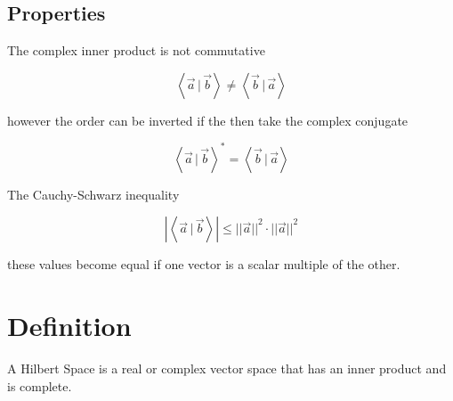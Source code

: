 \documentclass{article}
\newcommand{\braket}[1]{\left\langle#1\right\rangle}
\newcommand{\innerprod}[2]{\braket{#1\,|\,#2}}
\begin{document}
\subsection{Properties}

The complex inner product is not commutative

\[
    \innerprod{\vec{a}}{\vec{b}} \neq \innerprod{\vec{b}}{\vec{a}}
\]

however the order can be inverted if the then take the complex conjugate

\[
    \innerprod{\vec{a}}{\vec{b}}^{*} = \innerprod{\vec{b}}{\vec{a}}
\]

The Cauchy-Schwarz inequality

\[
    \left|\innerprod{\vec{a}}{\vec{b}}\right| \leq {||\vec{a}||}^2 \cdot {||\vec{a}||}^2
\]

these values become equal if one vector is a scalar multiple of the other.

\pagebreak

\section{Definition}

A Hilbert Space is a real or complex vector space that has an inner product and is complete.

\end{document}
